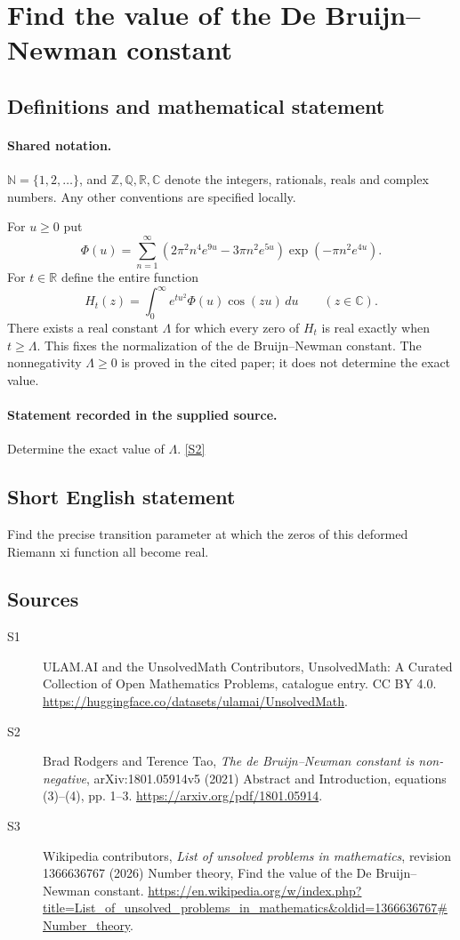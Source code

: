 \documentclass[11pt]{article}
\newcommand{\sref}[2]{\hyperlink{source:#1:#2}{[S#2]}}
\begin{document}
\section{Find the value of the De Bruijn–Newman constant}\label{statement}

\subsection{Definitions and mathematical statement}

\paragraph{Shared notation.}$\mathbb N=\{1,2,\ldots\}$, and $\mathbb Z,\mathbb Q,\mathbb R,\mathbb C$ denote the integers, rationals, reals and complex numbers. Any other conventions are specified locally.


For $u\ge0$ put
\[
\Phi(u)=\sum_{n=1}^{\infty}(2\pi^2n^4e^{9u}-3\pi n^2e^{5u})\exp(-\pi n^2e^{4u}).
\]
For $t\in\mathbb R$ define the entire function
\[
H_t(z)=\int_0^{\infty}e^{tu^2}\Phi(u)\cos(zu)\,du\qquad(z\in\mathbb C).
\]
There exists a real constant $\Lambda$ for which every zero of $H_t$ is real exactly when $t\ge\Lambda$. This fixes the normalization of the de Bruijn--Newman constant. The nonnegativity $\Lambda\ge0$ is proved in the cited paper; it does not determine the exact value.
\paragraph{Statement recorded in the supplied source.}
Determine the exact value of $\Lambda$. \sref{statement}{2}
\subsection{Short English statement}
Find the precise transition parameter at which the zeros of this deformed Riemann xi function all become real.
\subsection{Sources}
\begin{description}
\item[\hypertarget{source:statement:1}{S1}] ULAM.AI and the UnsolvedMath Contributors, UnsolvedMath: A Curated Collection of Open Mathematics Problems, catalogue entry. CC BY 4.0. \url{https://huggingface.co/datasets/ulamai/UnsolvedMath}.
\item[\hypertarget{source:statement:2}{S2}] Brad Rodgers and Terence Tao, \emph{The de Bruijn--Newman constant is non-negative}, arXiv:1801.05914v5 (2021) Abstract and Introduction, equations (3)--(4), pp. 1--3. \url{https://arxiv.org/pdf/1801.05914}.
\item[\hypertarget{source:statement:3}{S3}] Wikipedia contributors, \emph{List of unsolved problems in mathematics}, revision 1366636767 (2026) Number theory, Find the value of the De Bruijn–Newman constant. \url{https://en.wikipedia.org/w/index.php?title=List_of_unsolved_problems_in_mathematics&oldid=1366636767#Number_theory}.
\end{description}
\label{end:statement}
\end{document}
